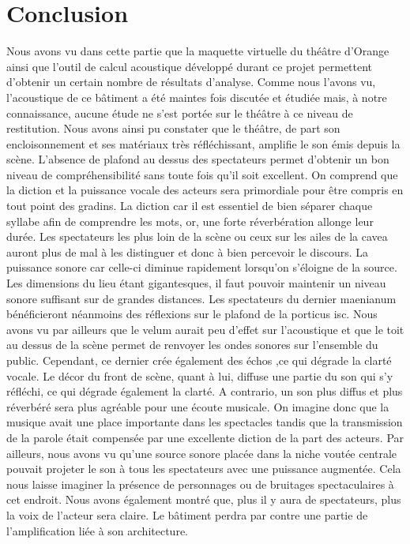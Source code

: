 \chapter*{Conclusion}
Nous avons vu dans cette partie que la maquette virtuelle du théâtre d'Orange ainsi que l'outil de calcul acoustique développé durant ce projet permettent d'obtenir un certain nombre de résultats d'analyse. Comme nous l'avons vu, l'acoustique de ce bâtiment a été maintes fois discutée et étudiée mais, à notre connaissance, aucune étude ne s'est portée sur le théâtre à ce niveau de restitution. Nous avons ainsi pu constater que le théâtre, de part son encloisonnement et ses matériaux très réfléchissant, amplifie le son émis depuis la scène. L'absence de plafond au dessus des spectateurs permet d'obtenir un bon niveau de compréhensibilité sans toute fois qu'il soit excellent. On comprend que la diction et la puissance vocale des acteurs sera primordiale pour être compris en tout point des gradins. La diction car il est essentiel de bien séparer chaque syllabe afin de comprendre les mots, or, une forte réverbération allonge leur durée. Les spectateurs les plus loin de la scène ou ceux sur les ailes de la \gls{cavea} auront plus de mal à les distinguer et donc à bien percevoir le discours. La puissance sonore car celle-ci diminue rapidement lorsqu'on s'éloigne de la source. Les dimensions du lieu étant gigantesques, il faut pouvoir maintenir un niveau sonore suffisant sur de grandes distances. Les spectateurs du dernier \gls{maenianum} bénéficieront néanmoins des réflexions sur le plafond de la \gls{porticus isc}. Nous avons vu par ailleurs que le \gls{velum} aurait peu d'effet sur l'acoustique et que le toit au dessus de la scène permet de renvoyer les ondes sonores sur l'ensemble du public. Cependant, ce dernier crée également des échos ,ce qui dégrade la clarté vocale. Le décor du front de scène, quant à lui, diffuse une partie du son qui s'y réfléchi, ce qui dégrade également la clarté. A contrario, un son plus diffus et plus réverbéré sera plus agréable pour une écoute musicale. On imagine donc que la musique avait une place importante dans les spectacles tandis que la transmission de la parole était compensée par une excellente diction de la part des acteurs. Par ailleurs, nous avons vu qu'une source sonore placée dans la niche voutée centrale pouvait projeter le son à tous les spectateurs avec une puissance augmentée. Cela nous laisse imaginer la présence de personnages ou de bruitages spectaculaires à cet endroit. Nous avons également montré que, plus il y aura de spectateurs, plus la voix de l'acteur sera claire. Le bâtiment perdra par contre une partie de l'amplification liée à son architecture.

